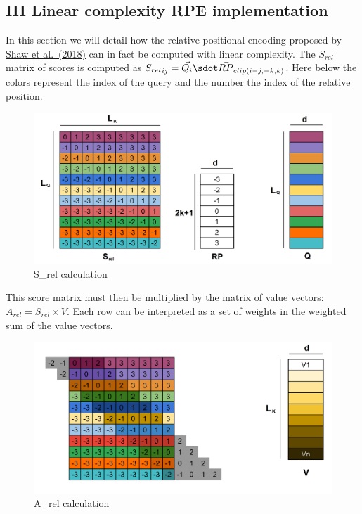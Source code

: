 \hypertarget{iii-linear-complexity-rpe-implementation}{%
\subsection{III Linear complexity RPE
implementation}\label{iii-linear-complexity-rpe-implementation}}

In this section we will detail how the relative positional encoding
proposed by \href{https://arxiv.org/abs/1803.02155}{Shaw et al.~(2018)}
can in fact be computed with linear complexity. The \(S_{rel}\) matrix
of scores is computed as
\({S_{rel}}_{ij} = \vec{Q_i} \sdot \vec{RP}_{clip(i-j, -k, k)}\). Here
below the colors represent the index of the query and the number the
index of the relative position.

\begin{figure}
\centering
\includegraphics{images/S_rel.png}
\caption{S\_rel calculation}
\end{figure}

This score matrix must then be multiplied by the matrix of value
vectors: \(A_{rel} = S_{rel} \times V\). Each row can be interpreted as
a set of weights in the weighted sum of the value vectors.

\begin{figure}
\centering
\includegraphics{images/S_rel_V.png}
\caption{A\_rel calculation}
\end{figure}

